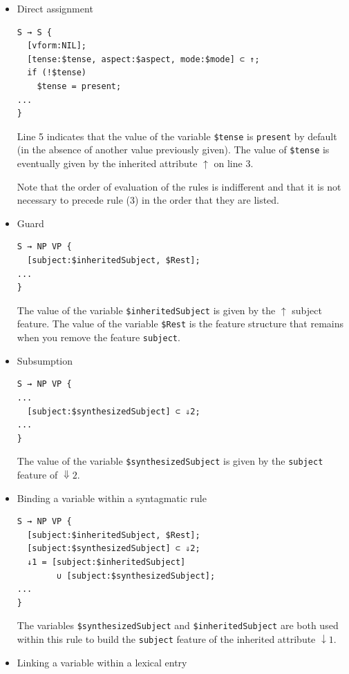 \documentclass[11pt]{article}
\begin{document}
\begin{itemize}
	\item Direct assignment
	      \begin{lstlisting}
S → S {
  [vform:NIL];
  [tense:$tense, aspect:$aspect, mode:$mode] ⊂ ↑;
  if (!$tense)
    $tense = present;
...
}
\end{lstlisting}
	      Line 5 indicates that the value of the variable \verb#$tense# is
	      \verb#present# by default (in the absence of another value previously given). The
	      value of
	      \verb#$tense# is eventually given by the inherited attribute
	      $\uparrow$ on line 3.

	      Note that the order of evaluation of the rules is indifferent and that it
	      is not necessary to precede rule (3) in the order that they are listed.

	\item Guard
	      \begin{lstlisting}[numbers=none]
S → NP VP {
  [subject:$inheritedSubject, $Rest];
...
}
\end{lstlisting}

	      The value of the variable \verb#$inheritedSubject# is given
	      by the $\uparrow$ subject feature. The value of the variable
	      \verb#$Rest# is the feature structure that remains when you remove the
	      feature \verb#subject#.

	\item Subsumption
	      \begin{lstlisting}[numbers=none]
S → NP VP {
...
  [subject:$synthesizedSubject] ⊂ ⇓2;
...
}
\end{lstlisting}

	      The value of the variable \verb#$synthesizedSubject# is given
	      by the \verb#subject# feature of $\Downarrow2$.

	\item Binding a variable within a syntagmatic rule
	      \begin{lstlisting}[numbers=none]
S → NP VP {
  [subject:$inheritedSubject, $Rest];
  [subject:$synthesizedSubject] ⊂ ⇓2;
  ↓1 = [subject:$inheritedSubject] 
  		∪ [subject:$synthesizedSubject];
...
}
\end{lstlisting}

	      The variables \verb#$synthesizedSubject# and \verb#$inheritedSubject#
	      are both used within this rule to build the \verb#subject# feature of
	      the inherited attribute $\downarrow1$.

	\item Linking a variable within a lexical entry


\end{itemize}
\end{document}
